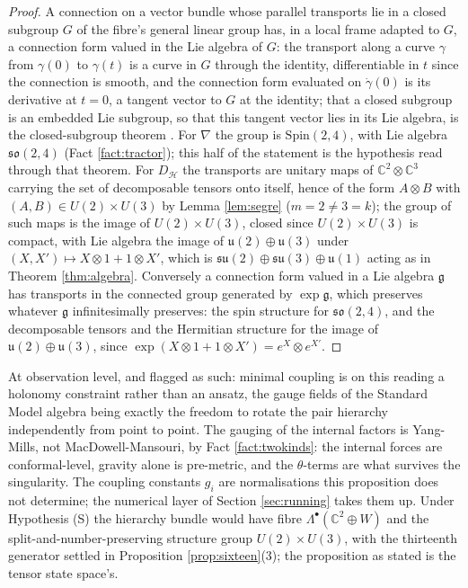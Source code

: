 \documentclass[11pt]{article}
\theoremstyle{definition}
\newcommand{\C}{\mathbb{C}}
\newcommand{\su}{\mathfrak{su}}
\newcommand{\uu}{\mathfrak{u}}
\begin{document}
\begin{proof}
A connection on a vector bundle whose parallel transports lie in a closed subgroup $G$ of the fibre's general linear group has, in a local frame adapted to $G$, a connection form valued in the Lie algebra of $G$: the transport along a curve $\gamma$ from $\gamma(0)$ to $\gamma(t)$ is a curve in $G$ through the identity, differentiable in $t$ since the connection is smooth, and the connection form evaluated on $\dot\gamma(0)$ is its derivative at $t = 0$, a tangent vector to $G$ at the identity; that a closed subgroup is an embedded Lie subgroup, so that this tangent vector lies in its Lie algebra, is the closed-subgroup theorem \cite[Thm.~20.12]{Lee2013}. For $\nabla$ the group is $\mathrm{Spin}(2,4)$, with Lie algebra $\mathfrak{so}(2,4)$ (Fact \ref{fact:tractor}); this half of the statement is the hypothesis read through that theorem. For $D_{\mathcal{H}}$ the transports are unitary maps of $\C^{2} \otimes \C^{3}$ carrying the set of decomposable tensors onto itself, hence of the form $A \otimes B$ with $(A, B) \in U(2) \times U(3)$ by Lemma \ref{lem:segre} ($m = 2 \neq 3 = k$); the group of such maps is the image of $U(2) \times U(3)$, closed since $U(2) \times U(3)$ is compact, with Lie algebra the image of $\uu(2) \oplus \uu(3)$ under $(X, X') \mapsto X \otimes 1 + 1 \otimes X'$, which is $\su(2) \oplus \su(3) \oplus \uu(1)$ acting as in Theorem \ref{thm:algebra}. Conversely a connection form valued in a Lie algebra $\mathfrak{g}$ has transports in the connected group generated by $\exp\mathfrak{g}$, which preserves whatever $\mathfrak{g}$ infinitesimally preserves: the spin structure for $\mathfrak{so}(2,4)$, and the decomposable tensors and the Hermitian structure for the image of $\uu(2) \oplus \uu(3)$, since $\exp(X \otimes 1 + 1 \otimes X') = e^{X} \otimes e^{X'}$.
\end{proof}

At observation level, and flagged as such: minimal coupling is on this reading a holonomy constraint rather than an ansatz, the gauge fields of the Standard Model algebra being exactly the freedom to rotate the pair hierarchy independently from point to point. The gauging of the internal factors is Yang-Mills, not MacDowell-Mansouri, by Fact \ref{fact:twokinds}: the internal forces are conformal-level, gravity alone is pre-metric, and the $\theta$-terms are what survives the singularity. The coupling constants $g_{i}$ are normalisations this proposition does not determine; the numerical layer of Section \ref{sec:running} takes them up. Under Hypothesis (S) the hierarchy bundle would have fibre $\Lambda^{\bullet}(\C^{2} \oplus W)$ and the split-and-number-preserving structure group $U(2) \times U(3)$, with the thirteenth generator settled in Proposition \ref{prop:sixteen}(3); the proposition as stated is the tensor state space's.
\end{document}
